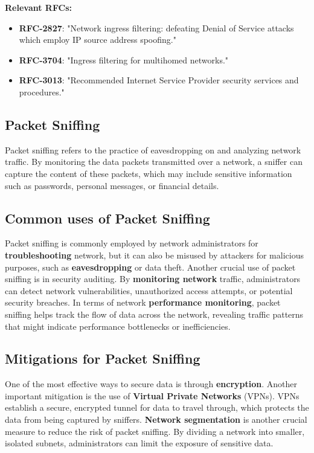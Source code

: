 \textbf{Relevant RFCs:}
\begin{itemize}
    \item \textbf{RFC-2827}: "Network ingress filtering: defeating Denial of Service attacks which employ IP source address spoofing."
    \item \textbf{RFC-3704}: "Ingress filtering for multihomed networks."
    \item \textbf{RFC-3013}: "Recommended Internet Service Provider security services and procedures."
\end{itemize}

\begin{center}
    \section{Packet Sniffing} 
\end{center}
Packet sniffing refers to the practice of eavesdropping on and analyzing network traffic. By monitoring the data packets transmitted over a network, a sniffer can capture the content of these packets, which may include sensitive information such as passwords, personal messages, or financial details.

\subsection{Common uses of Packet Sniffing}
Packet sniffing is commonly employed by network administrators for \textbf{troubleshooting} network, but it can also be misused by attackers for malicious purposes, such as \textbf{eavesdropping} or data theft. Another crucial use of packet sniffing is in security auditing. By \textbf{monitoring network} traffic, administrators can detect network vulnerabilities, unauthorized access attempts, or potential security breaches. In terms of network \textbf{performance monitoring}, packet sniffing helps track the flow of data across the network, revealing traffic patterns that might indicate performance bottlenecks or inefficiencies.

\subsection{Mitigations for Packet Sniffing}
One of the most effective ways to secure data is through \textbf{encryption}. Another important mitigation is the use of \textbf{Virtual Private Networks} (VPNs). VPNs establish a secure, encrypted tunnel for data to travel through, which protects the data from being captured by sniffers. \textbf{Network segmentation} is another crucial measure to reduce the risk of packet sniffing. By dividing a network into smaller, isolated subnets, administrators can limit the exposure of sensitive data. 

